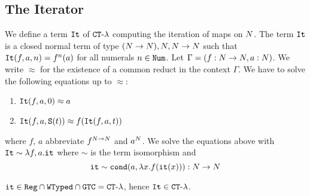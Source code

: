 %




\subsection{The Iterator}

\begin{Eg}
We define a term ${\tt It}$ of  ${ {\tt CT}\mbox{-}\lambda}$ computing the iteration of maps on ${N}$.
The term ${\tt It}$ is a closed normal term of type $({N} \rightarrow {N}), {N},{N} \rightarrow {N}$ such 
that ${\tt It}(f,a,n)=f^n(a)$ for all numerals $n \in {\tt Num}$. 
Let $\Gamma = (f:{N} \rightarrow {N}, a:{N})$. We write $\approx$ for
the existence of a common reduct in the context $\Gamma$. 
We have to solve the following equations up to $\approx$:

\begin{enumerate}
\item
${\tt It}(f,a,0) \approx a$ 
\item
${\tt It}(f,a,{\tt S} (t)) \approx f({\tt It}(f,a,t))$
\end{enumerate}

where $f$, $a$ abbreviate $f^{{N}\rightarrow{N}}$ and $a^{N}$.
We solve the equations above with ${\tt It} \sim \lambda f, a.{\tt it}$
where $\sim$ is the term isomorphism and
$$
{\tt it} \sim {\tt cond} (a, \lambda x.f({\tt it}(x))):{N} \rightarrow {N}
$$ 
\end{Eg}

\begin{proposition}
\label{proposition-iterator-in-CT-lambda}
${\tt it} \in {\tt Reg} \cap {\tt WTyped} \cap {\tt GTC} = { {\tt CT}\mbox{-}\lambda}$, 
hence ${\tt It} \in { {\tt CT}\mbox{-}\lambda}$.
\end{proposition}

